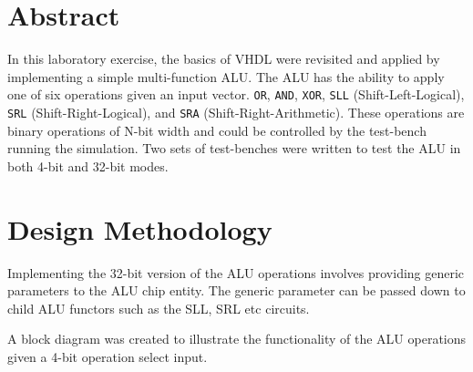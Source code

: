 \documentclass[CMPE]{../KGCOEReport}
\def\code#1{\texttt{#1}}
\begin{document}
    \maketitle
    \section*{Abstract}

    In this laboratory exercise, the basics of VHDL were revisited and applied by implementing a simple multi-function ALU.
    The ALU has the ability to apply one of six operations given an input vector.
    \code{OR}, \code{AND}, \code{XOR}, \code{SLL} (Shift-Left-Logical), \code{SRL} (Shift-Right-Logical), and
    \code{SRA} (Shift-Right-Arithmetic).
    These operations are binary operations of N-bit width and could be controlled by the test-bench running the simulation.
    Two sets of test-benches were written to test the ALU in both 4-bit and 32-bit modes.

    \section*{Design Methodology}
    Implementing the 32-bit version of the ALU operations involves providing generic parameters
    to the ALU chip entity.
    The generic parameter can be passed down to child ALU functors such as the SLL, SRL etc circuits.

    A block diagram was created to illustrate the functionality of the ALU operations given a 4-bit operation
    select input.
\end{document}
